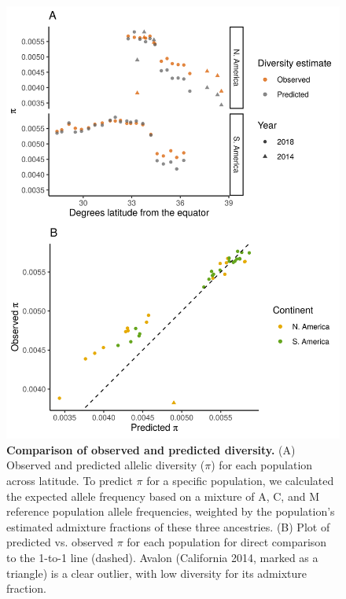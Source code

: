 \begin{figure}[ht]
\includegraphics[width=.8\textwidth]{chapter1/figures/pi_observed_and_predicted_from_admixture.png}
\caption{ \textbf{Comparison of observed and predicted diversity.} (A) Observed and predicted allelic diversity ($\pi$) for each population across latitude. To predict $\pi$ for a specific population, we calculated the expected allele frequency based on a mixture of A, C, and M reference population allele frequencies, weighted by the population's estimated admixture fractions of these three ancestries. (B) Plot of predicted vs. observed $\pi$ for each population for direct comparison to the 1-to-1 line (dashed). Avalon (California 2014, marked as a triangle) is a clear outlier, with low diversity for its admixture fraction.}
\label{pred_vs_obs_pi}
\end{figure}

